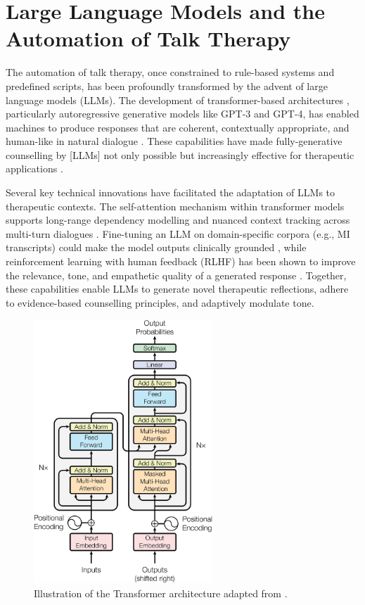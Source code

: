 \section{Large Language Models and the Automation of Talk Therapy}
The automation of talk therapy, once constrained to rule-based systems and predefined scripts, has been profoundly transformed by the advent of large language models (LLMs). The development of transformer-based architectures \cite{vaswani2017attention}, particularly autoregressive generative models like GPT-3 and GPT-4, has enabled machines to produce responses that are coherent, contextually appropriate, and human-like in natural dialogue \cite{openai2023gpt4}. These capabilities have made fully-generative counselling by [LLMs] not only possible but increasingly effective for therapeutic applications \cite{miner2020artificial, torous2023generative}.

Several key technical innovations have facilitated the adaptation of LLMs to therapeutic contexts. The self-attention mechanism within transformer models supports long-range dependency modelling and nuanced context tracking across multi-turn dialogues \cite{vaswani2017attention}. Fine-tuning an LLM on domain-specific corpora (e.g., MI transcripts) could make the model outputs clinically grounded \cite{valentino2024evaluating}, while reinforcement learning with human feedback (RLHF) has been shown to improve the relevance, tone, and empathetic quality of a generated response \cite{10.5555/3600270.3602281, gilson2023empathy}. Together, these capabilities enable LLMs to generate novel therapeutic reflections, adhere to evidence-based counselling principles, and adaptively modulate tone.



\begin{figure}[ht]
    \centering
    \includegraphics[width=0.6\textwidth]{fig/transformer_architecture.png}
    \caption{Illustration of the Transformer architecture adapted from \citet{vaswani2017attention}.}
    \label{fig:transformer}
\end{figure}


